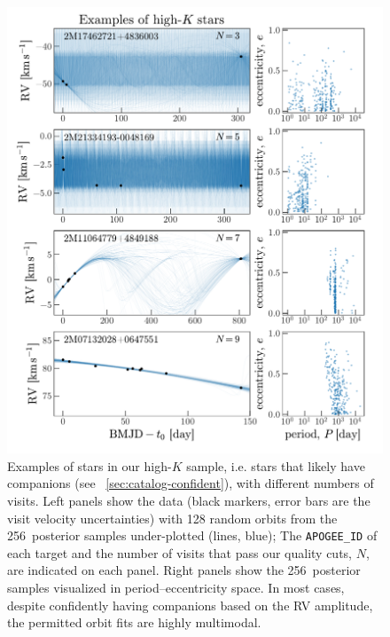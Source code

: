 \documentclass[modern, letterpaper]{aastex62}
\newcommand{\nposterior}{256}
\begin{document}
\begin{figure}[hp]
\begin{center}
\includegraphics[width=\textwidth]{highK-0}
\end{center}
\caption{%
Examples of stars in our high-$K$ sample, i.e. stars that likely have companions
(see \sectionname~\ref{sec:catalog-confident}), with different numbers of
visits.
Left panels show the data (black markers, error bars are the visit velocity
uncertainties) with 128 random orbits from the \nposterior\ posterior samples
under-plotted (lines, blue); The \texttt{APOGEE\_ID} of each target and the
number of visits that pass our quality cuts, $N$, are indicated on each panel.
Right panels show the \nposterior\ posterior samples visualized in
period--eccentricity space.
In most cases, despite confidently having companions based on the RV amplitude,
the permitted orbit fits are highly multimodal.
\label{fig:highK-0}
}
\end{figure}
\end{document}
